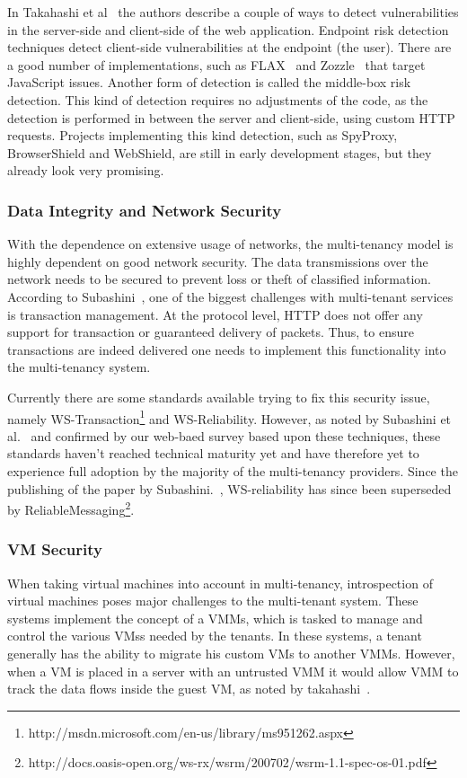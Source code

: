 In Takahashi et al~\cite{Takahashi2012Security} the authors describe a couple of ways to detect vulnerabilities in the server-side and client-side of the web application. 
Endpoint risk detection techniques detect client-side vulnerabilities at the endpoint (the user). 
There are a good number of implementations, such as FLAX~\cite{saxena10kudzu} and Zozzle~\cite{curtsinger2011zozzle} that target JavaScript issues. 
Another form of detection is called the middle-box risk detection. 
This kind of detection requires no adjustments of the code, as the detection is performed in between the server and client-side, using custom HTTP requests. 
Projects implementing this kind detection, such as SpyProxy, BrowserShield and WebShield, are still in early development stages, but they already look very promising.

\subsubsection{Data Integrity and Network Security}
With the dependence on extensive usage of networks, the multi-tenancy model is highly dependent on good network security.  
The data transmissions over the network needs to be secured to prevent loss or theft of classified information. 
According to Subashini~\cite{Subashini2011Security}, one of the biggest challenges with multi-tenant services is transaction management. 
At the protocol level, HTTP does not offer any support for transaction or guaranteed delivery of packets. 
Thus, to ensure transactions are indeed delivered one needs to implement this functionality into the multi-tenancy system.

Currently there are some standards available trying to fix this security issue, namely WS-Transaction\footnote{http://msdn.microsoft.com/en-us/library/ms951262.aspx} and WS-Reliability.
However, as noted by Subashini et al.~\cite{Subashini2011Security} and confirmed by our web-baed survey based upon these techniques, these standards haven’t reached technical maturity yet and have therefore yet to experience full adoption by the majority of the multi-tenancy providers.
Since the publishing of the paper by Subashini.~\cite{Subashini2011Security}, WS-reliability has since been superseded by ReliableMessaging\footnote{http://docs.oasis-open.org/ws-rx/wsrm/200702/wsrm-1.1-spec-os-01.pdf}.

\subsubsection{\acf{VM} Security}
When taking virtual machines into account in multi-tenancy, introspection of virtual machines poses major challenges to the multi-tenant system. 
These systems implement the concept of a \acp{VMM}, which is tasked to manage and control the various \acp{VM}s needed by the tenants.
In these systems, a tenant generally has the ability to migrate his custom \acp{VM} to another \acp{VMM}. 
However, when a \ac{VM} is placed in a server with an untrusted \ac{VMM} it would allow \ac{VMM} to track the data flows inside the guest VM, as noted by takahashi~\cite{Takahashi2012Security}.

